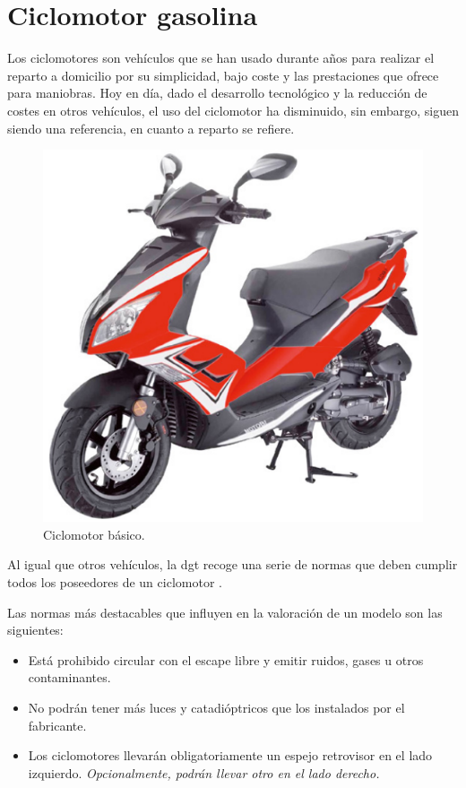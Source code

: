 \newpage
\section{Ciclomotor gasolina}
\label{anexo:Ciclomotor Gasolina}

Los \gls{ciclomotores} son vehículos que se han usado durante años para realizar el reparto a domicilio por su simplicidad, bajo coste y las prestaciones que ofrece para maniobras. Hoy en día, dado el desarrollo tecnológico y la reducción de costes en otros vehículos, el uso del ciclomotor ha disminuido, sin embargo, siguen siendo una referencia, en cuanto a reparto se refiere.

\begin{figure}[h]
    \centering
    \includegraphics[scale = 1]{archivos/ciclomotor.pdf}
    \caption{Ciclomotor básico.}
    \label{fig:ciclomotor_basico}
\end{figure}

Al igual que otros vehículos, la \gls{dgt} recoge una serie de normas que deben cumplir todos los poseedores de un ciclomotor \cite{dgtciclomotores,boe11722}.

Las normas más destacables que influyen en la valoración de un modelo son las siguientes:
\begin{itemize}
    \item Está prohibido circular con el escape libre y emitir ruidos, gases u otros contaminantes.
    \item No podrán tener más luces y catadióptricos que los instalados por el fabricante.
    \item Los ciclomotores llevarán obligatoriamente un espejo retrovisor en el lado izquierdo. \textit{Opcionalmente, podrán llevar otro en el lado derecho.}
\end{itemize}

